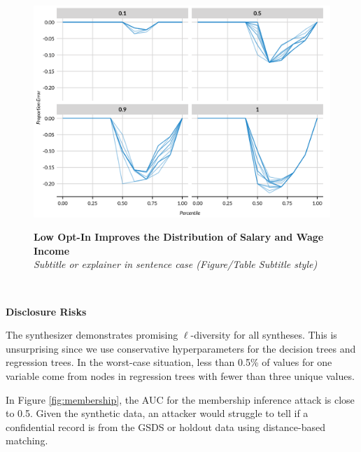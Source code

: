\documentclass[
]{urban-formatting}
\begin{document}
\begin{figure}[htbp]
    \caption{
    \textbf{Low Opt-In Improves the Distribution of Salary and Wage Income}\\
    \textit{Subtitle or explainer in sentence case (Figure/Table Subtitle style)}
    }
    \centering
    \includegraphics[width=6.5in]{../analysis/figures/percentiles-1.png}
    \label{fig:wage-income}
\end{figure}
\begin{singlespace}
    \\
\end{singlespace}

\textbf{Disclosure Risks}

The synthesizer demonstrates promising \(\ell\)-diversity for all
syntheses. This is unsurprising since we use conservative
hyperparameters for the decision trees and regression trees. In the
worst-case situation, less than 0.5\% of values for one variable come
from nodes in regression trees with fewer than three unique values.

In Figure \ref{fig:membership}, the AUC for the membership inference
attack is close to 0.5. Given the synthetic data, an attacker would
struggle to tell if a confidential record is from the GSDS or holdout
data using distance-based matching.
\end{document}
